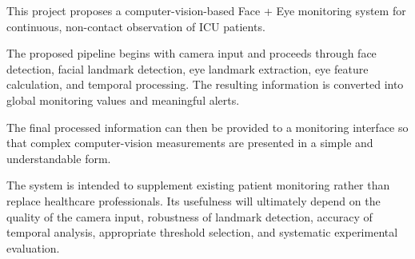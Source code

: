 \documentclass[12pt]{tietreport}
\begin{document}
This project proposes a computer-vision-based Face + Eye monitoring
system for continuous, non-contact observation of ICU patients.

The proposed pipeline begins with camera input and proceeds through
face detection, facial landmark detection, eye landmark extraction,
eye feature calculation, and temporal processing. The resulting
information is converted into global monitoring values and meaningful
alerts.

The final processed information can then be provided to a monitoring
interface so that complex computer-vision measurements are presented
in a simple and understandable form.

The system is intended to supplement existing patient monitoring
rather than replace healthcare professionals. Its usefulness will
ultimately depend on the quality of the camera input, robustness of
landmark detection, accuracy of temporal analysis, appropriate
threshold selection, and systematic experimental evaluation.


\printbibliography
\end{document}
